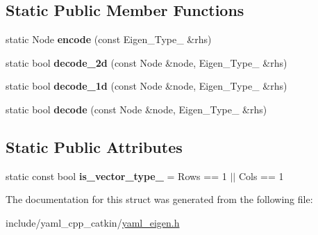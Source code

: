 \subsection*{Static Public Member Functions}
\begin{DoxyCompactItemize}
\item 
static Node {\bfseries encode} (const Eigen\+\_\+\+Type\+\_\+ \&rhs)\hypertarget{structYAML_1_1convert_3_01Eigen_1_1Matrix_3_01Scalar_00_01Rows_00_01Cols_00_01Align_00_01RowsAtC8665abb6da4eb6935869b0ee422ba9ce_ab1716b1cd1af6ef1bdb89dd867b05dc6}{}\label{structYAML_1_1convert_3_01Eigen_1_1Matrix_3_01Scalar_00_01Rows_00_01Cols_00_01Align_00_01RowsAtC8665abb6da4eb6935869b0ee422ba9ce_ab1716b1cd1af6ef1bdb89dd867b05dc6}

\item 
static bool {\bfseries decode\+\_\+2d} (const Node \&node, Eigen\+\_\+\+Type\+\_\+ \&rhs)\hypertarget{structYAML_1_1convert_3_01Eigen_1_1Matrix_3_01Scalar_00_01Rows_00_01Cols_00_01Align_00_01RowsAtC8665abb6da4eb6935869b0ee422ba9ce_a27f60d49bf29a84c2d3e14a52e12df65}{}\label{structYAML_1_1convert_3_01Eigen_1_1Matrix_3_01Scalar_00_01Rows_00_01Cols_00_01Align_00_01RowsAtC8665abb6da4eb6935869b0ee422ba9ce_a27f60d49bf29a84c2d3e14a52e12df65}

\item 
static bool {\bfseries decode\+\_\+1d} (const Node \&node, Eigen\+\_\+\+Type\+\_\+ \&rhs)\hypertarget{structYAML_1_1convert_3_01Eigen_1_1Matrix_3_01Scalar_00_01Rows_00_01Cols_00_01Align_00_01RowsAtC8665abb6da4eb6935869b0ee422ba9ce_a596a49e214c2b493de23185ca5d7ff38}{}\label{structYAML_1_1convert_3_01Eigen_1_1Matrix_3_01Scalar_00_01Rows_00_01Cols_00_01Align_00_01RowsAtC8665abb6da4eb6935869b0ee422ba9ce_a596a49e214c2b493de23185ca5d7ff38}

\item 
static bool {\bfseries decode} (const Node \&node, Eigen\+\_\+\+Type\+\_\+ \&rhs)\hypertarget{structYAML_1_1convert_3_01Eigen_1_1Matrix_3_01Scalar_00_01Rows_00_01Cols_00_01Align_00_01RowsAtC8665abb6da4eb6935869b0ee422ba9ce_ab8738e33c1392218faf566a1e75395e4}{}\label{structYAML_1_1convert_3_01Eigen_1_1Matrix_3_01Scalar_00_01Rows_00_01Cols_00_01Align_00_01RowsAtC8665abb6da4eb6935869b0ee422ba9ce_ab8738e33c1392218faf566a1e75395e4}

\end{DoxyCompactItemize}
\subsection*{Static Public Attributes}
\begin{DoxyCompactItemize}
\item 
static const bool {\bfseries is\+\_\+vector\+\_\+type\+\_\+} = Rows == 1 $\vert$$\vert$ Cols == 1\hypertarget{structYAML_1_1convert_3_01Eigen_1_1Matrix_3_01Scalar_00_01Rows_00_01Cols_00_01Align_00_01RowsAtC8665abb6da4eb6935869b0ee422ba9ce_a02420fa6ad9be337bfcdbb83f7c292c3}{}\label{structYAML_1_1convert_3_01Eigen_1_1Matrix_3_01Scalar_00_01Rows_00_01Cols_00_01Align_00_01RowsAtC8665abb6da4eb6935869b0ee422ba9ce_a02420fa6ad9be337bfcdbb83f7c292c3}

\end{DoxyCompactItemize}


The documentation for this struct was generated from the following file\+:\begin{DoxyCompactItemize}
\item 
include/yaml\+\_\+cpp\+\_\+catkin/\hyperlink{yaml__eigen_8h}{yaml\+\_\+eigen.\+h}\end{DoxyCompactItemize}

